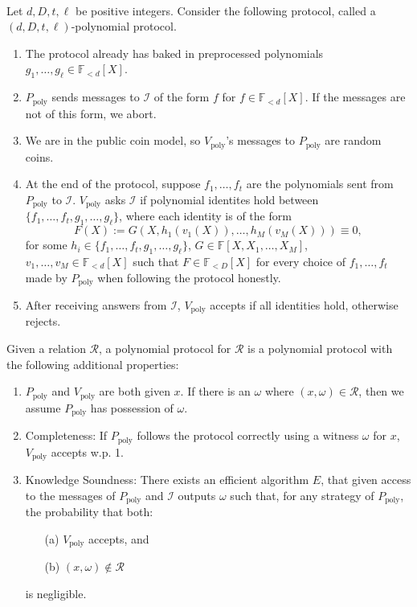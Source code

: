 \documentclass[11pt]{article}
\newcommand{\field}{\mathbb{F}}
\begin{document}
\paragraph{} Let $d, D, t, \ell$ be positive integers. Consider the following protocol, called a $(d, D, t, \ell)$-polynomial protocol.
\begin{enumerate}
    \item The protocol already has baked in preprocessed polynomials $g_1, \ldots, g_\ell \in \field_{<d}[X]$.
    \item $P_\text{poly}$ sends messages to $\mathcal{I}$ of the form $f$ for $f \in \field_{<d}[X]$. If the messages are not of this form, we abort.
    \item We are in the public coin model, so $V_\text{poly}$'s messages to $P_\text{poly}$ are random coins.
    \item At the end of the protocol, suppose $f_1, \ldots, f_t$ are the polynomials sent from $P_\text{poly}$ to $\mathcal{I}$. $V_\text{poly}$ asks $\mathcal{I}$ if polynomial identites hold between $\{f_1, \ldots, f_t, g_1, \ldots, g_\ell\}$, where each identity is of the form
    \[ F(X) := G(X, h_1(v_1(X)), \ldots, h_M(v_M(X))) \equiv 0, \]
    for some $h_i \in \{f_1, \ldots, f_t, g_1, \ldots, g_\ell\}$, $G \in \field[X, X_1, \ldots, X_M]$, $v_1, \ldots, v_M \in \field_{<d}[X]$ such that $F \in \field_{<D}[X]$ for every choice of $f_1, \ldots, f_t$ made by $P_\text{poly}$ when following the protocol honestly.

    \item After receiving answers from $\mathcal{I}$, $V_\text{poly}$ accepts if all identities hold, otherwise rejects.
\end{enumerate}

\begin{definition}
    Given a relation $\mathcal{R}$, a polynomial protocol for $\mathcal{R}$ is a polynomial protocol with the following additional properties:
    \begin{enumerate}
        \item $P_\text{poly}$ and $V_\text{poly}$ are both given $x$. If there is an $\omega$ where $(x, \omega) \in \mathcal{R}$, then we assume $P_\text{poly}$ has possession of $\omega$.
        \item Completeness: If $P_\text{poly}$ follows the protocol correctly using a witness $\omega$ for $x$, $V_\text{poly}$ accepts w.p. 1.
        \item Knowledge Soundness: There exists an efficient algorithm $E$, that given access to the messages of $P_\text{poly}$ and $\mathcal{I}$ outputs $\omega$ such that, for any strategy of $P_\text{poly}$, the probability that both:
        \begin{itemize}
            \item[(a)] $V_\text{poly}$ accepts, and
            \item[(b)] $(x, \omega) \notin \mathcal{R}$
        \end{itemize}
        is negligible.
    \end{enumerate}
\end{definition}
\end{document}
